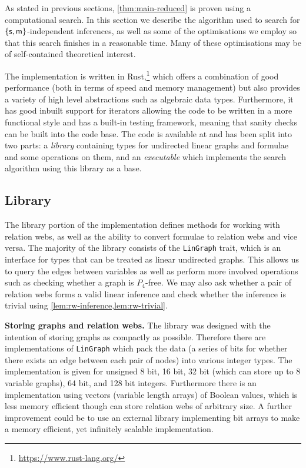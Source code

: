 \documentclass[a4paper, UKenglish, cleveref]{lipics-v2019}
\begin{document}
As stated in previous sections, \cref{thm:main-reduced} is proven using a computational search. In this section we describe the algorithm used to search for \(\{\mathsf{s},\mathsf{m}\}\)-independent inferences, as well as some of the optimisations we employ so that this search finishes in a reasonable time.
Many of these optimisations may be of self-contained theoretical interest.

The implementation is written in Rust,\footnote{\url{https://www.rust-lang.org/}} which offers a combination of good performance (both in terms of speed and memory management) but also provides a variety of high level abstractions such as algebraic data types. Furthermore, it has good inbuilt support for iterators allowing the code to be written in a more functional style and has a built-in testing framework, meaning that sanity checks can be built into the code base. The code is available at \cite{Ric21:implementation} and has been split into two parts: a \emph{library} containing types for undirected linear graphs and formulae and some operations on them, and an \emph{executable} which implements the search algorithm using this library as a base.

\subsection{Library}
\label{sec:library}

The library portion of the implementation defines methods for working with relation webs, as well as the ability to convert formulae to relation webs and vice versa. The majority of the library consists of the \texttt{LinGraph} trait, which is an interface for types that can be treated as linear undirected graphs. This allows us to query the edges between variables as well as perform more involved operations such as checking whether a graph is \(P_4\)-free.
We may also ask whether a pair of relation webs forms a valid linear inference and check whether the inference is trivial using \cref{lem:rw-inference,lem:rw-trivial}.


\textbf{Storing graphs and relation webs.}
The library was designed with the intention of storing graphs as compactly as possible.
 Therefore there are implementations of \texttt{LinGraph} which pack the data (a series of bits for whether there exists an edge between each pair of nodes) into various integer types. The implementation is given for unsigned 8 bit, 16 bit, 32 bit (which can store up to 8 variable graphs), 64 bit, and 128 bit integers. Furthermore there is an implementation using vectors (variable length arrays) of Boolean values, which is less memory efficient though can store relation webs of arbitrary size. A further improvement could be to use an external library implementing bit arrays to make a memory efficient, yet infinitely scalable implementation.
\end{document}
